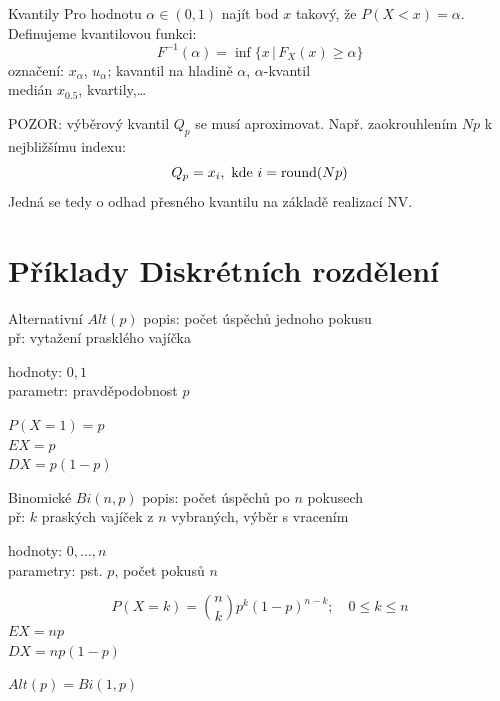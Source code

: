 \documentclass[smaller]{beamer}
\def\where{\,|\,}                    %
\def\xskip{{\vspace{2ex}}}
\begin{document}
\begin{frame}{Kvantily}
Pro hodnotu $\alpha \in (0,1)$ najít bod $x$ takový, že $P(X < x) = \alpha$.  Definujeme
{\df kvantilovou funkci}:
\[
  F^{-1}(\alpha) = \inf\{x \where F_X(x)\ge\alpha\}
\]
označení: $x_\alpha$, $u_\alpha$; kavantil na hladině $\alpha$, $\alpha$-kvantil\\
medián $x_{0.5}$, kvartily,\dots

\vspace{2ex} POZOR: výběrový kvantil $Q_p$ se musí aproximovat. Např.
zaokrouhlením $Np$ k nejbližšímu indexu:
\[
  Q_p = x_i, \text{ kde } i = {\rm round}(Np)
\]
Jedná se tedy o odhad přesného kvantilu na základě realizací NV.



\end{frame}

\section{Příklady Diskrétních rozdělení}

\begin{frame}{Alternativní $Alt(p)$}
popis: počet úspěchů jednoho pokusu\\
př: vytažení prasklého vajíčka 

\xskip
hodnoty: $0, 1$\\
parametr: pravděpodobnost $p$

\xskip
$P( X=1 ) = p$\\
$EX = p$\\
$DX = p(1-p)$
\end{frame}

\begin{frame}{Binomické $Bi(n,p)$}
popis: počet úspěchů po $n$ pokusech\\
př: $k$ praských vajíček z $n$ vybraných, výběr s vracením

\xskip
hodnoty: $0, \dots, n$ \\
parametry: pst. $p$, počet pokusů $n$

\xskip
\[
 P(X=k) = \binom{n}{k}p^k(1-p)^{n-k};\quad 0\le k \le n
\]
$EX = np$\\
$DX = np(1-p)$

\xskip
$Alt(p) = Bi(1,p)$
\end{frame}
\end{document}
